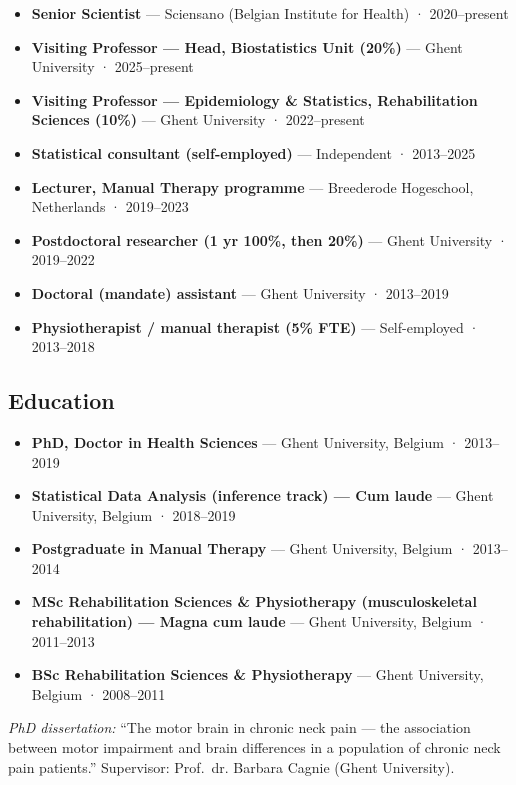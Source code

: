 \documentclass[
  letterpaper,
  DIV=11,
  numbers=noendperiod]{scrartcl}
\providecommand{\tightlist}{%
  \setlength{\itemsep}{0pt}\setlength{\parskip}{0pt}}\usepackage{longtable,booktabs,array}
\begin{document}
\begin{itemize}
\tightlist
\item
  \textbf{Senior Scientist} --- Sciensano (Belgian Institute for Health)
  · 2020--present
\item
  \textbf{Visiting Professor --- Head, Biostatistics Unit (20\%)} ---
  Ghent University · 2025--present
\item
  \textbf{Visiting Professor --- Epidemiology \& Statistics,
  Rehabilitation Sciences (10\%)} --- Ghent University · 2022--present
\item
  \textbf{Statistical consultant (self-employed)} --- Independent ·
  2013--2025
\item
  \textbf{Lecturer, Manual Therapy programme} --- Breederode Hogeschool,
  Netherlands · 2019--2023
\item
  \textbf{Postdoctoral researcher (1 yr 100\%, then 20\%)} --- Ghent
  University · 2019--2022
\item
  \textbf{Doctoral (mandate) assistant} --- Ghent University ·
  2013--2019
\item
  \textbf{Physiotherapist / manual therapist (5\% FTE)} ---
  Self-employed · 2013--2018
\end{itemize}

\subsection{Education}\label{education}

\begin{itemize}
\tightlist
\item
  \textbf{PhD, Doctor in Health Sciences} --- Ghent University, Belgium
  · 2013--2019
\item
  \textbf{Statistical Data Analysis (inference track) --- Cum laude} ---
  Ghent University, Belgium · 2018--2019
\item
  \textbf{Postgraduate in Manual Therapy} --- Ghent University, Belgium
  · 2013--2014
\item
  \textbf{MSc Rehabilitation Sciences \& Physiotherapy (musculoskeletal
  rehabilitation) --- Magna cum laude} --- Ghent University, Belgium ·
  2011--2013
\item
  \textbf{BSc Rehabilitation Sciences \& Physiotherapy} --- Ghent
  University, Belgium · 2008--2011
\end{itemize}

\emph{PhD dissertation:} ``The motor brain in chronic neck pain --- the
association between motor impairment and brain differences in a
population of chronic neck pain patients.'' Supervisor: Prof.~dr.
Barbara Cagnie (Ghent University).
\end{document}
